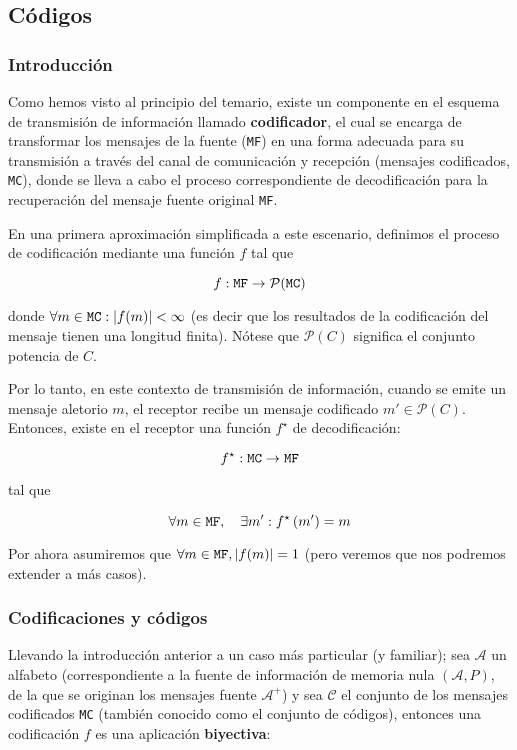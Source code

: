 \subsection{Códigos}\label{cuxf3digos}

\subsubsection{Introducción}\label{introducciuxf3n-codigos}

Como hemos visto al principio del temario, existe un componente en el
esquema de transmisión de información llamado \textbf{codificador}, el
cual se encarga de transformar los mensajes de la fuente (\texttt{MF})
en una forma adecuada para su transmisión a través del canal de
comunicación y recepción (mensajes codificados, \texttt{MC}), donde se
lleva a cabo el proceso correspondiente de decodificación para la
recuperación del mensaje fuente original \texttt{MF}.

En una primera aproximación simplificada a este escenario, definimos el
proceso de codificación mediante una función \(f\) tal que

\[
f:\text{\texttt{MF}}\rightarrow\mathcal{P}(\text{\texttt{MC}})
\]

donde \(\forall m\in\text{\texttt{MC}}: \left|f(m)\right|<\infty\) (es
decir que los resultados de la codificación del mensaje tienen una
longitud finita). Nótese que \(\mathcal{P}(C)\) significa el conjunto
potencia de \(C\).

Por lo tanto, en este contexto de transmisión de información, cuando se
emite un mensaje aletorio \(m\), el receptor recibe un mensaje
codificado \(m'\in\mathcal{P}(C)\). Entonces, existe en el receptor una
función \(f^\star\) de decodificación:

\[
f^\star:\text{\texttt{MC}}\rightarrow\text{\texttt{MF}}
\]

tal que

\[
\forall m\in \text{\texttt{MF}}, \quad\exists m': f^\star\left(m'\right) = m
\]

Por ahora asumiremos que
\(\forall m\in \text{\texttt{MF}}, \left|f(m)\right| = 1\) (pero veremos
que nos podremos extender a más casos).

\subsubsection{Codificaciones y
códigos}\label{codificaciones-y-cuxf3digos}

Llevando la introducción anterior a un caso más particular (y familiar);
sea \(\mathcal{A}\) un alfabeto (correspondiente a la fuente de
información de memoria nula \((\mathcal{A},P)\), de la que se originan
los mensajes fuente \(\mathcal{A^+}\)) y sea \(\mathcal{C}\) el conjunto
de los mensajes codificados \texttt{MC} (también conocido como el
conjunto de códigos), entonces una codificación \(f\) es una aplicación
\textbf{biyectiva}:

